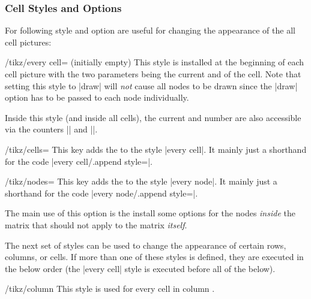 \subsubsection{Cell Styles and Options}

For following style and option are useful for changing the appearance
of the all cell pictures:

\begin{stylekey}{/tikz/every cell= (initially \normalfont empty)}
  This style is installed at the beginning of each cell picture with
  the two parameters being the current  and  of
  the cell. Note that setting this style to |draw| will \emph{not}
  cause all nodes to be drawn since the |draw| option has to be passed
  to each node individually.

  Inside this style (and inside all cells), the current  and
   number are also accessible via the counters
  |\pgfmatrixcurrentrow| and |\pgfmatrixcurrentcolumn|.   
\end{stylekey}

\begin{key}{/tikz/cells=}
  This key adds the  to the style |every cell|. It mainly
  just a shorthand for the code
  |every cell/.append style=|.
\end{key}

\begin{key}{/tikz/nodes=}
  This key adds the  to the style |every node|. It mainly
  just a shorthand for the code |every node/.append style=|.

  The main use of this option is the install some options for the
  nodes \emph{inside} the matrix that should not apply to the matrix
  \emph{itself}. 

\begin{codeexample}[]
\end{codeexample}
\end{key}

The next set of styles can be used to change the appearance of certain
rows, columns, or cells. If more than one of these styles is defined,
they are executed in the below order (the |every cell| style is
executed before all of the below).
\begin{stylekey}{/tikz/column }
  This style is used for every cell in column .
\end{stylekey}

